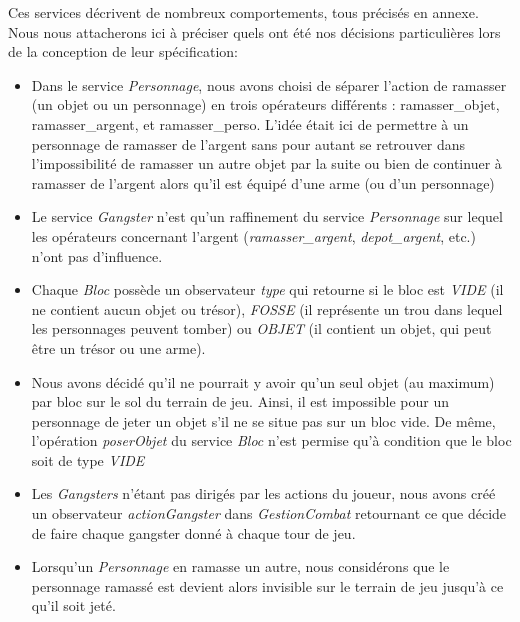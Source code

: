 \documentclass[a4paper, 11pt, notitlepage]{article}
\begin{document}
Ces services décrivent de nombreux comportements, tous précisés en annexe. Nous nous attacherons ici à préciser quels ont été nos décisions particulières lors de la conception de leur spécification: \\

\begin{itemize}

\item Dans le service \emph{Personnage}, nous avons choisi de séparer l'action de ramasser (un objet ou un personnage) en trois opérateurs différents : ramasser\_objet, ramasser\_argent, et ramasser\_perso. L'idée était ici de permettre à un personnage de ramasser de l'argent sans pour autant se retrouver dans l'impossibilité de ramasser un autre objet par la suite ou bien de continuer à ramasser de l'argent alors qu'il est équipé d'une arme (ou d'un personnage) \\

\item Le service \emph{Gangster} n'est qu'un raffinement du service \emph{Personnage} sur lequel les opérateurs concernant l'argent (\emph{ramasser\_argent}, \emph{depot\_argent}, etc.) n'ont pas d'influence.  \\

\item Chaque \emph{Bloc} possède un observateur \emph{type} qui retourne si le bloc est \emph{VIDE} (il ne contient aucun objet ou trésor), \emph{FOSSE} (il représente un trou dans lequel les personnages peuvent tomber) ou \emph{OBJET} (il contient un objet, qui peut être un trésor ou une arme).  \\

\item Nous avons décidé qu'il ne pourrait y avoir qu'un seul objet (au maximum) par bloc sur le sol du terrain de jeu. Ainsi, il est impossible pour un personnage de jeter un objet s'il ne se situe pas sur un bloc vide. De même, l'opération \emph{poserObjet} du service \emph{Bloc} n'est permise qu'à condition que le bloc soit de type \emph{VIDE} \\

\item Les \emph{Gangsters} n'étant pas dirigés par les actions du joueur, nous avons créé un observateur \emph{actionGangster} dans \emph{GestionCombat} retournant ce que décide de faire chaque gangster donné à chaque tour de jeu.  \\

\item Lorsqu'un \emph{Personnage} en ramasse un autre, nous considérons que le personnage ramassé est devient alors invisible sur le terrain de jeu jusqu'à ce qu'il soit jeté. \\ 


\end{itemize}
\end{document}
